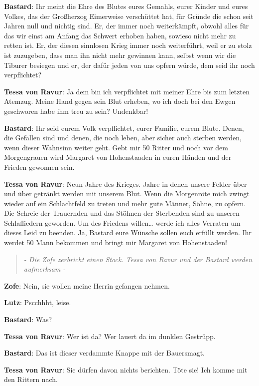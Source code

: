 \documentclass[a5paper,7pt, twocolumn]{book}
\begin{document}
\textbf{Bastard}: Ihr meint die Ehre des Blutes eures Gemahls, eurer Kinder und eures Volkes, das der Großherzog Eimerweise verschüttet hat, für Gründe die schon seit Jahren null und nichtig sind. Er, der immer noch weiterkämpft, obwohl alles für das wir einst am Anfang das Schwert erhoben haben, sowieso nicht mehr zu retten ist. Er, der diesen sinnlosen Krieg immer noch weiterführt, weil er zu stolz ist zuzugeben, dass man ihn nicht mehr gewinnen kann, selbst wenn wir die Tiburer besiegen und er, der dafür jeden von uns opfern würde, dem seid ihr noch verpflichtet?

\textbf{Tessa von Ravur}: Ja dem bin ich verpflichtet mit meiner Ehre bis zum letzten Atemzug. Meine Hand gegen sein Blut erheben, wo ich doch bei den Ewgen geschworen habe ihm treu zu sein? Undenkbar!

\textbf{Bastard}: Ihr seid eurem Volk verpflichtet, eurer Familie, eurem Blute. Denen, die Gefallen sind und denen, die noch leben, aber sicher auch sterben werden, wenn dieser Wahnsinn weiter geht. Gebt mir 50 Ritter und noch vor dem Morgengrauen wird Margaret von Hohenstaaden in euren Händen und der Frieden gewonnen sein.

\textbf{Tessa von Ravur}: Neun Jahre des Krieges. Jahre in denen unsere Felder über und über getränkt werden mit unserem Blut. Wenn die Morgenröte mich zwingt wieder auf ein Schlachtfeld zu treten und mehr gute Männer, Söhne, zu opfern. Die Schreie der Trauernden und das Stöhnen der Sterbenden sind zu unseren Schlafliedern geworden. Um des Friedens willen… werde ich alles Verraten um dieses Leid zu beenden. Ja, Bastard eure Wünsche sollen euch erfüllt werden. Ihr werdet 50 Mann bekommen und bringt mir Margaret von Hohenstaaden!

\begin{quote}
  \textit{- Die Zofe zerbricht einen Stock. Tessa von Ravur und der Bastard werden aufmerksam -}
 \end{quote}


\textbf{Zofe}: Nein, sie wollen meine Herrin gefangen nehmen.

\textbf{Lutz}: Pscchhht, leise.

\textbf{Bastard}: Was?

\textbf{Tessa von Ravur}: Wer ist da? Wer lauert da im dunklen Gestrüpp.

\textbf{Bastard}: Das ist dieser verdammte Knappe mit der Bauersmagt.

\textbf{Tessa von Ravur}: Sie dürfen davon nichts berichten. Töte sie! Ich komme mit den Rittern nach.
\end{document}
